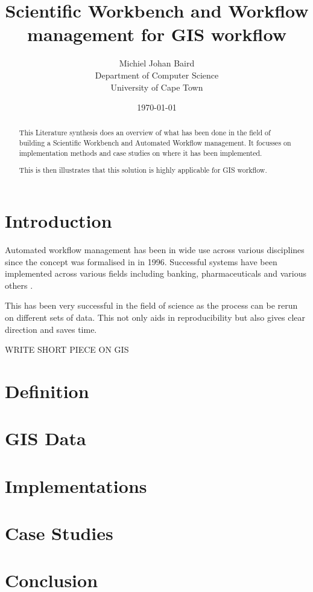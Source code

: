 \documentclass[12pt,twocolumn]{article}
\title{Scientific Workbench and Workflow management for GIS workflow}
\author{
    Michiel Johan Baird \\
        Department of Computer Science \\
        University of Cape Town
}
\date{\today}
\begin{document}
\maketitle
\begin{abstract}
    This Literature synthesis does an overview of what has been done
    in the field of building a Scientific Workbench and Automated
    Workflow management. It focusses on implementation methods and
    case studies on where it has been implemented.

    This is then illustrates that this solution is highly applicable
    for GIS workflow.
\end{abstract}
\section{Introduction}
    Automated workflow management has been in wide use across
    various disciplines since the concept was formalised in in
    1996\cite{springerlink:10.1007/BF00136712}. Successful systems
    have been implemented across various fields including banking,
    pharmaceuticals and various others
    \cite{Brahe:2007:SWW:1316624.1316661,5407993}.

    This has been very successful in the field of science as
    the process can be rerun on different sets of data.\cite{4721191}
    This not only aids in reproducibility but also gives
    clear direction and saves time.

    WRITE SHORT PIECE ON GIS

\section{Definition}

\section{GIS Data}

\section{Implementations}

\section{Case Studies}

\section{Conclusion}


{}

\end{document}
